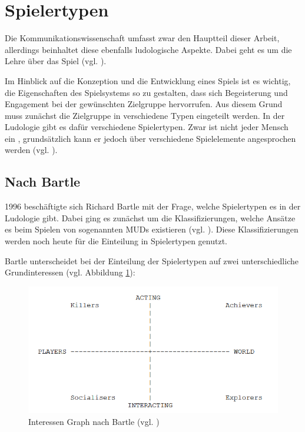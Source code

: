 \section{Spielertypen}
Die Kommunikationswissenschaft umfasst zwar den Hauptteil dieser Arbeit, allerdings beinhaltet diese ebenfalls ludologische Aspekte. Dabei geht es um die Lehre über das Spiel (vgl. \cite{ludologie_spielforschung_nodate}). 

Im Hinblick auf die Konzeption und die Entwicklung eines Spiels ist es wichtig, die Eigenschaften des Spielsystems so zu gestalten, dass sich Begeisterung und Engagement bei der gewünschten Zielgruppe hervorrufen. Aus diesem Grund muss zunächst die Zielgruppe in verschiedene Typen eingeteilt werden. In der Ludologie gibt es dafür verschiedene Spielertypen. Zwar ist nicht jeder Mensch ein , grundsätzlich kann er jedoch über verschiedene Spielelemente angesprochen werden (vgl. \cite{ludologie_spielertypen_nodate}).

\subsection{Nach Bartle}
1996 beschäftigte sich Richard Bartle mit der Frage, welche Spielertypen es in der Ludologie gibt. Dabei ging es zunächst um die Klassifizierungen, welche Ansätze es beim Spielen von sogenannten \ac{MUD}s existieren (vgl. \cite{bartle_hearts_1996}). Diese Klassifizierungen werden noch heute für die Einteilung in Spielertypen genutzt.

Bartle unterscheidet bei der Einteilung der Spielertypen auf zwei unterschiedliche Grundinteressen (vgl. Abbildung \ref{fig:bartle-muds}):

\begin{figure}[ht]
\centering
\includegraphics[width=1\linewidth]{content/pictures/basic_interests.PNG}
\caption{Interessen Graph nach Bartle (vgl. \cite{bartle_hearts_1996})}
\label{fig:bartle-muds}
\end{figure}

